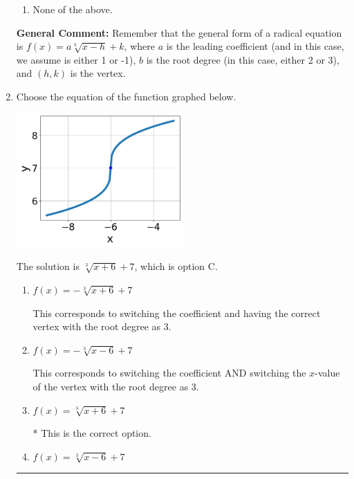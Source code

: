\documentclass{extbook}[14pt]
\newcommand{\litem}[1]{\item #1

\rule{\textwidth}{0.4pt}}
\begin{document}
\begin{enumerate}
{\begin{enumerate}[label=\Alph*.]
\item None of the above.\end{enumerate}
\textbf{General Comment:} Remember that the general form of a radical equation is $ f(x) = a \sqrt[b]{x - h} + k $, where $a$ is the leading coefficient (and in this case, we assume is either 1 or -1), $b$ is the root degree (in this case, either 2 or 3), and $(h, k)$ is the vertex.
}
\litem{
Choose the equation of the function graphed below.

\begin{center}
    \includegraphics[width=0.5\textwidth]{../Figures/radicalGraphToEquationA.png}
\end{center}


The solution is \( \sqrt[3]{x + 6} + 7 \), which is option C.\begin{enumerate}[label=\Alph*.]
\item \( f(x) = - \sqrt[3]{x + 6} + 7 \)

This corresponds to switching the coefficient and having the correct vertex with the root degree as $3$.
\item \( f(x) = - \sqrt[3]{x - 6} + 7 \)

This corresponds to switching the coefficient AND switching the $x$-value of the vertex with the root degree as $3$.
\item \( f(x) = \sqrt[3]{x + 6} + 7 \)

* This is the correct option.
\item \( f(x) = \sqrt[3]{x - 6} + 7 \)


\end{enumerate}}
\end{enumerate}
\end{document}
